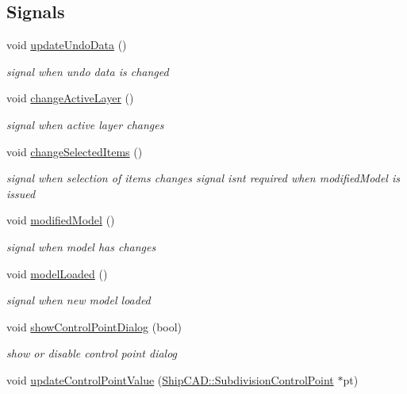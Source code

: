 \subsection*{Signals}
\begin{DoxyCompactItemize}
\item 
void \hyperlink{classShipCAD_1_1Controller_ade17d53952bf5a977dfec2e68f4fffb9}{update\+Undo\+Data} ()
\begin{DoxyCompactList}\small\item\em signal when undo data is changed \end{DoxyCompactList}\item 
void \hyperlink{classShipCAD_1_1Controller_aea2802b3826e7b6f7d5eae78db07f7e0}{change\+Active\+Layer} ()
\begin{DoxyCompactList}\small\item\em signal when active layer changes \end{DoxyCompactList}\item 
void \hyperlink{classShipCAD_1_1Controller_ae28eabc4c698e3bc8732a004d2ab4034}{change\+Selected\+Items} ()
\begin{DoxyCompactList}\small\item\em signal when selection of items changes signal isn\textquotesingle{}t required when modified\+Model is issued \end{DoxyCompactList}\item 
void \hyperlink{classShipCAD_1_1Controller_ad4efe8ed2137a3ad3a2f87550c00b10a}{modified\+Model} ()
\begin{DoxyCompactList}\small\item\em signal when model has changes \end{DoxyCompactList}\item 
void \hyperlink{classShipCAD_1_1Controller_a61d8a1d0d26a123ef81527ba32932bd2}{model\+Loaded} ()
\begin{DoxyCompactList}\small\item\em signal when new model loaded \end{DoxyCompactList}\item 
void \hyperlink{classShipCAD_1_1Controller_a24cda66f9ccc1c9bc24f8885bcf97255}{show\+Control\+Point\+Dialog} (bool)
\begin{DoxyCompactList}\small\item\em show or disable control point dialog \end{DoxyCompactList}\item 
void \hyperlink{classShipCAD_1_1Controller_a35f446710a96c227f1794eacaef7ba6a}{update\+Control\+Point\+Value} (\hyperlink{classShipCAD_1_1SubdivisionControlPoint}{Ship\+C\+A\+D\+::\+Subdivision\+Control\+Point} $\ast$pt)

\end{DoxyCompactItemize}
